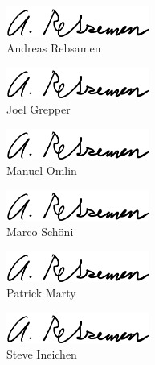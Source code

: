 \documentclass[main.tex]{subfiles}
\begin{document}
\begin{flushleft}
    \begin{figure}[H]
        \includegraphics[height=1cm,]{AR}\\
        Andreas Rebsamen \\
    \end{figure}
    \begin{figure}[H]
        \includegraphics[height=1cm,]{AR}\\
        Joel Grepper\\
    \end{figure}
    \begin{figure}[H]
        \includegraphics[height=1cm,]{AR}\\
        Manuel Omlin\\
    \end{figure}
    \begin{figure}[H]
        \includegraphics[height=1cm,]{AR}\\
        Marco Schöni\\ 
    \end{figure}
    \begin{figure}[H]
        \includegraphics[height=1cm,]{AR}\\
        Patrick Marty\\ 
    \end{figure}
    \begin{figure}[H]
        \includegraphics[height=1cm,]{AR}\\
        Steve Ineichen\\
    \end{figure}
\end{flushleft}


\pagebreak
\end{document}
